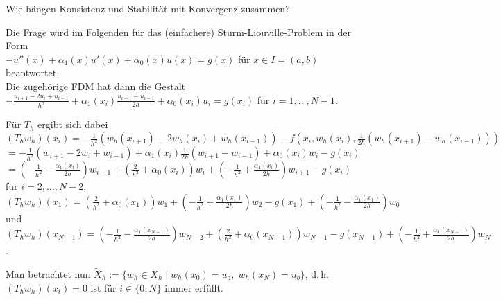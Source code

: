 \begin{Bem}
    Wie hängen Konsistenz und Stabilität mit Konvergenz zusammen?

    Die Frage wird im Folgenden für das (einfachere) Sturm-Liouville-Problem
    in der Form\\
    $-u''(x) + \alpha_1(x) u'(x) + \alpha_0(x) u(x) = g(x)$ für
    $x \in I = (a, b)$ beantwortet.\\
    Die zugehörige FDM hat dann die Gestalt
    $-\frac{u_{i+1} - 2 u_i + u_{i-1}}{h^2} + \alpha_1(x_i)
    \frac{u_{i+1} - u_{i-1}}{2h} + \alpha_0(x_i) u_i = g(x_i)$
    für $i = 1, \dotsc, N - 1$.

    Für $T_h$ ergibt sich dabei\\
    $(T_h w_h)(x_i) =
    -\frac{1}{h^2} (w_h(x_{i+1}) - 2 w_h(x_i) + w_h(x_{i-1})) -
    f(x_i, w_h(x_i), \frac{1}{2h} (w_h(x_{i+1}) - w_h(x_{i-1})))$\\
    $= -\frac{1}{h^2} (w_{i+1} - 2w_i + w_{i-1}) +
    \alpha_1(x_i) \frac{1}{2h} (w_{i+1} - w_{i-1}) +
    \alpha_0(x_i) w_i - g(x_i)$\\
    $= (-\frac{1}{h^2} - \frac{\alpha_1(x_i)}{2h}) w_{i-1} +
    (\frac{2}{h^2} + \alpha_0(x_i)) w_i +
    (-\frac{1}{h^2} + \frac{\alpha_1(x_i)}{2h}) w_{i+1} - g(x_i)$
    für $i = 2, \dotsc, N - 2$,\\
    $(T_h w_h)(x_1) = (\frac{2}{h^2} + \alpha_0(x_1)) w_1 +
    (-\frac{1}{h^2} + \frac{\alpha_1(x_1)}{2h}) w_2 -
    g(x_1) + (-\frac{1}{h^2} - \frac{\alpha_1(x_1)}{2h}) w_0$ und\\
    $(T_h w_h)(x_{N-1}) =
    (-\frac{1}{h^2} - \frac{\alpha_1(x_{N-1})}{2h}) w_{N-2} +
    (\frac{2}{h^2} + \alpha_0(x_{N-1})) w_{N-1} -
    g(x_{N-1}) + (-\frac{1}{h^2} + \frac{\alpha_1(x_{N-1})}{2h}) w_N$.

    Man betrachtet nun $\widetilde{X}_h :=
    \{w_h \in X_h \;|\; w_h(x_0) = u_a,\; w_h(x_N) = u_b\}$, d.\,h.\\
    $(T_h w_h)(x_i) = 0$ ist für $i \in \{0, N\}$ immer erfüllt.


\end{Bem}
